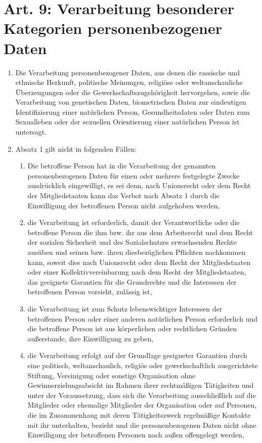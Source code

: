     \section[Art 9: Verarbeitung besonderer Daten]{Art. 9: Verarbeitung besonderer Kategorien personenbezogener Daten}
        \begin{enumerate}
            \item Die Verarbeitung personenbezogener Daten, aus denen die rassische und ethnische Herkunft, politische Meinungen, religiöse oder weltanschauliche Überzeugungen oder die Gewerkschaftszugehörigkeit hervorgehen, sowie die Verarbeitung von genetischen Daten, biometrischen Daten zur eindeutigen Identifizierung einer na\-tür\-lichen Person, Gesundheitsdaten oder Daten zum Sexualleben oder der sexuellen Orientierung einer natürlichen Person ist untersagt.
            \item Absatz 1 gilt nicht in folgenden Fällen:
                \begin{enumerate}[label=\alph*)]
                    \item Die betroffene Person hat in die Verarbeitung der genannten personenbezogenen Daten für einen oder mehrere festgelegte Zwecke ausdrücklich eingewilligt, es sei denn, nach Unionsrecht oder dem Recht der Mitgliedstaaten kann das Verbot nach Absatz 1 durch die Einwilligung der betroffenen Person nicht aufgehoben werden,
                    \item die Verarbeitung ist erforderlich, damit der Verantwortliche oder die betroffene Person die ihm bzw. ihr aus dem Arbeitsrecht und dem Recht der sozialen Sicherheit und des Sozialschutzes erwachsenden Rechte ausüben und seinen bzw. ihren diesbezüglichen Pflichten nachkommen kann, soweit dies nach Unionsrecht oder dem Recht der Mitgliedstaaten oder einer Kollektivvereinbarung nach dem Recht der Mitgliedstaaten, das geeignete Garantien für die Grundrechte und die Interessen der betroffenen Person vorsieht, zulässig ist,
                    \item die Verarbeitung ist zum Schutz lebenswichtiger Interessen der betroffenen Person oder einer anderen natürlichen Person erforderlich und die betroffene Person ist aus körperlichen oder rechtlichen Gründen außerstande, ihre Einwilligung zu geben, 
                    \item die Verarbeitung erfolgt auf der Grundlage geeigneter Garantien durch eine politisch, weltanschaulich, religiös oder gewerkschaftlich ausgerichtete Stiftung, Vereinigung oder sonstige Organisation ohne Gewinnerzielungsabsicht im Rahmen ihrer rechtmäßigen Tätigkeiten und unter der Voraussetzung, dass sich die Verarbeitung ausschließlich auf die Mitglieder oder ehemalige Mitglieder der Organisation oder auf Personen, die im Zusammenhang mit deren Tätigkeitszweck regelmäßige Kontakte mit ihr unterhalten, bezieht und die personenbezogenen Daten nicht ohne Einwilligung der betroffenen Personen nach außen offengelegt werden,

\end{enumerate}
\end{enumerate}
